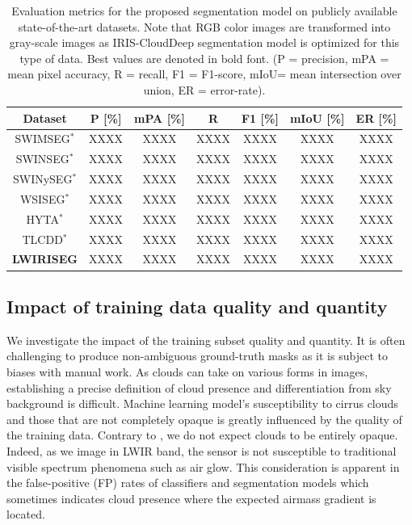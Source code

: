 \documentclass[amt, article]{copernicus}
\begin{document}
\begin{table}[t]
    \begin{center}
        \caption{Evaluation metrics for the proposed segmentation model on publicly available state-of-the-art datasets. Note that RGB color images are transformed into gray-scale images as IRIS-CloudDeep segmentation model is optimized for this type of data. Best values are denoted in bold font. (P = precision, mPA = mean pixel accuracy, R = recall, F1 = F1-score, mIoU= mean intersection over union, ER = error-rate).}
        \begin{tabular}{c c c c c c c} 
        \tophline \hline
         Dataset & P [\%] & mPA [\%] & R & F1 [\%] & mIoU [\%] & ER [\%] \\ [1.0ex]
         \hline
         SWIMSEG$^{*}$ & XXXX & XXXX & XXXX & XXXX & XXXX & XXXX \\ [1.0ex]
         SWINSEG$^{*}$ & XXXX & XXXX & XXXX & XXXX & XXXX & XXXX \\ [1.0ex]
         SWINySEG$^{*}$ & XXXX & XXXX & XXXX & XXXX & XXXX & XXXX \\ [1.0ex]
         WSISEG$^{*}$ & XXXX & XXXX & XXXX & XXXX & XXXX & XXXX \\ [1.0ex]
         HYTA$^{*}$ & XXXX & XXXX & XXXX & XXXX & XXXX & XXXX \\ [1.0ex]
         TLCDD$^{*}$ & XXXX & XXXX & XXXX & XXXX & XXXX & XXXX \\ [1.0ex]
         \textbf{LWIRISEG} & XXXX & XXXX & XXXX & XXXX & XXXX & XXXX \\
         \hline
        \end{tabular}
        \label{tab:datasets_comparison}
        \end{center}
    \end{table}


\subsection{Impact of training data quality and quantity}

We investigate the impact of the training subset quality and quantity.
It is often challenging to produce non-ambiguous ground-truth masks as it is subject to biases with manual work. As clouds can take on various forms in images, establishing a precise definition of cloud presence and differentiation from sky background is difficult. Machine learning model's susceptibility to cirrus clouds and those that are not completely opaque is greatly influenced by the quality of the training data. Contrary to \cite{Mommert2020}, we do not expect clouds to be entirely opaque. Indeed, as we image in LWIR band, the sensor is not susceptible to traditional visible spectrum phenomena such as air glow. This consideration is apparent in the false-positive (FP) rates of classifiers and segmentation models which sometimes indicates cloud presence where the expected airmass gradient is located.
\end{document}
